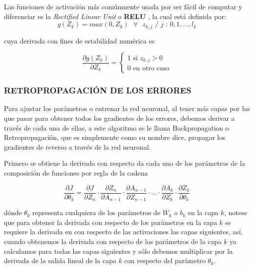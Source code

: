         Las funciones de activación más comúnmente usada por ser fácil de computar y diferenciar es la \textit{Rectified Linear Unit} o \textbf{RELU} \citep{Goodfellow-et-al-2016}, la cual está definida por:
        \begin{equation}
            g(Z_k) = max(0, Z_k) \text{ $\forall$ $z_{k,j}$ / $j$ : $0, 1, ..., l_k$}
        \end{equation}
        
        \noindent cuya derivada con fines de estabilidad numérica es
        
        \begin{equation}
			\frac{\partial g(Z_k)}{\partial Z_k} = 
			\begin{cases}
			\text{1 si } z_{k,j} > 0\\
			\text{0 en otro caso}
			\end{cases}
		\end{equation}
        
        \subsubsection{RETROPROPAGACIÓN DE LOS ERRORES}
        Para ajustar los parámetros o entrenar la red neuronal, al tener más capas por las que pasar para obtener todos los gradientes de los errores, debemos derivar a través de cada una de ellas, a este algoritmo se le llama Backpropagation o Retropropagación, que es simplemente como su nombre dice, propagar los gradientes de reverso a través de la red neuronal.
		
		Primero se obtiene la derivada con respecto da cada uno de los parámetros de la composición de funciones por regla de la cadena
		
		\begin{equation}
		    \frac{\partial J}{\partial \theta_k} = \frac{\partial J}{\partial Z_n} \cdot  \frac{\partial Z_{n}}{\partial A_{n-1}} \cdot \frac{\partial A_{n-1}}{\partial Z_{n-1}} \cdot  \dots \cdot \frac{\partial A_{k}}{\partial Z_{k}} \cdot \frac{\partial Z_{k}}{\partial \theta_{k}}
		\end{equation}
		
		\noindent dónde $\theta_k$ representa cualquiera de los parámetros de $W_k$ o $b_k$ en la capa $k$, notese que para obtener la derivada con respecto de los parámetros en la capa $k$ se requiere la derivada en con respecto de las activaciones las capas siguientes, así, cuando obtenemos la derivada con respecto de los parámetros de la capa $k$ ya calculamos para todas las capas siguientes y sólo debemos multiplicar por la derivada de la salida lineal de la capa $k$ con respecto del parámetro $\theta_k$. \citep{bishop}
		
